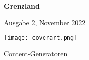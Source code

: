 
\centering
{\bfseries\fontsize{58}{55}\selectfont Grenzland}

\hrulefill
\large Ausgabe 2, November 2022

	  \texttt{[image: coverart.png]}

{\Huge Content-Generatoren \par}%
